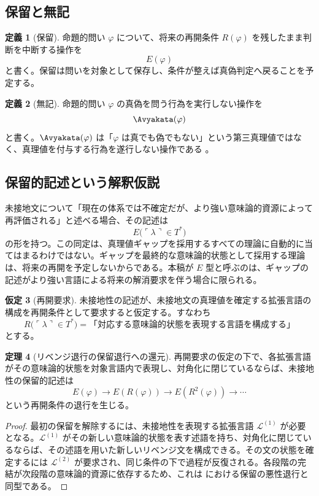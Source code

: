 \documentclass[11pt,a4paper]{article}
\theoremstyle{definition}
\newtheorem{definition}{定義}[section]
\newtheorem{assumption}[definition]{仮定}
\theoremstyle{definition}
\newtheorem{theorem}[definition]{定理}
\newcommand{\Epoch}{E}
\newcommand{\Resume}{R}
\newcommand{\Lang}{\mathcal{L}}
\begin{document}
\subsection{保留と無記}

\begin{definition}[保留]
命題的問い $\varphi$ について、将来の再開条件 $\Resume(\varphi)$ を残したまま判断を中断する操作を
\[
 \Epoch(\varphi)
\]
と書く。保留は問いを対象として保存し、条件が整えば真偽判定へ戻ることを予定する。
\end{definition}

\begin{definition}[無記]
命題的問い $\varphi$ の真偽を問う行為を実行しない操作を
\[
 \Avyakata(\varphi)
\]
と書く。$\Avyakata(\varphi)$ は「$\varphi$ は真でも偽でもない」という第三真理値ではなく、真理値を付与する行為を遂行しない操作である \cite{ChibaAvyakata2026}。
\end{definition}

\subsection{保留的記述という解釈仮説}

未接地文について「現在の体系では不確定だが、より強い意味論的資源によって再評価される」と述べる場合、その記述は
\[
 \Epoch\bigl(\ulcorner\lambda\urcorner\in T^*\bigr)
\]
の形を持つ。この同定は、真理値ギャップを採用するすべての理論に自動的に当てはまるわけではない。ギャップを最終的な意味論的状態として採用する理論は、将来の再開を予定しないからである。本稿が $\Epoch$ 型と呼ぶのは、ギャップの記述がより強い言語による将来の解消要求を伴う場合に限られる。

\begin{assumption}[再開要求]
未接地性の記述が、未接地文の真理値を確定する拡張言語の構成を再開条件として要求すると仮定する。すなわち
\[
 \Resume\bigl(\ulcorner\lambda\urcorner\in T^*\bigr)
 =\text{「対応する意味論的状態を表現する言語を構成する」}
\]
とする。
\end{assumption}

\begin{theorem}[リベンジ退行の保留退行への還元]
再開要求の仮定の下で、各拡張言語がその意味論的状態を対象言語内で表現し、対角化に閉じているならば、未接地性の保留的記述は
\[
 \Epoch(\varphi)
 \longrightarrow\Epoch(\Resume(\varphi))
 \longrightarrow\Epoch(\Resume^2(\varphi))
 \longrightarrow\cdots
\]
という再開条件の退行を生じる。
\end{theorem}

\begin{proof}
最初の保留を解除するには、未接地性を表現する拡張言語 $\Lang^{(1)}$ が必要となる。$\Lang^{(1)}$ がその新しい意味論的状態を表す述語を持ち、対角化に閉じているならば、その述語を用いた新しいリベンジ文を構成できる。その文の状態を確定するには $\Lang^{(2)}$ が要求され、同じ条件の下で過程が反復される。各段階の完結が次段階の意味論的資源に依存するため、これは \cite{ChibaAvyakata2026} における保留の悪性退行と同型である。
\end{proof}
\end{document}
